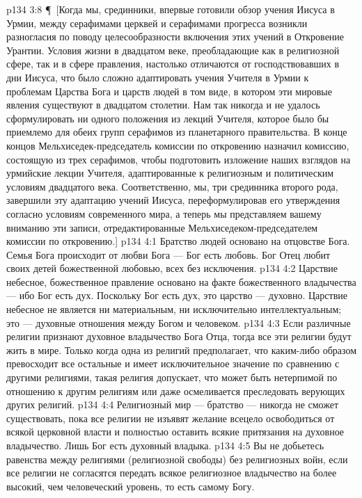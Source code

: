 \vs p134 3:8 \P\ [Когда мы, срединники, впервые готовили обзор учения Иисуса в Урмии, между серафимами церквей и серафимами прогресса возникли разногласия по поводу целесообразности включения этих учений в Откровение Урантии. Условия жизни в двадцатом веке, преобладающие как в религиозной сфере, так и в сфере правления, настолько отличаются от господствовавших в дни Иисуса, что было сложно адаптировать учения Учителя в Урмии к проблемам Царства Бога и царств людей в том виде, в котором эти мировые явления существуют в двадцатом столетии. Нам так никогда и не удалось сформулировать ни одного положения из лекций Учителя, которое было бы приемлемо для обеих групп серафимов из планетарного правительства. В конце концов Мельхиседек\hyp{}председатель комиссии по откровению назначил комиссию, состоящую из трех серафимов, чтобы подготовить изложение наших взглядов на урмийские лекции Учителя, адаптированные к религиозным и политическим условиям двадцатого века. Соответственно, мы, три срединника второго рода, завершили эту адаптацию учений Иисуса, переформулировав его утверждения согласно условиям современного мира, а теперь мы представляем вашему вниманию эти записи, отредактированные Мельхиседеком\hyp{}председателем комиссии по откровению.]
\vs p134 4:1 Братство людей основано на отцовстве Бога. Семья Бога происходит от любви Бога --- Бог есть любовь. Бог Отец любит своих детей божественной любовью, всех без исключения.
\vs p134 4:2 Царствие небесное, божественное правление основано на факте божественного владычества --- ибо Бог есть дух. Поскольку Бог есть дух, это царство --- духовно. Царствие небесное не является ни материальным, ни исключительно интеллектуальным; это --- духовные отношения между Богом и человеком.
\vs p134 4:3 Если различные религии признают духовное владычество Бога Отца, тогда все эти религии будут жить в мире. Только когда одна из религий предполагает, что каким\hyp{}либо образом превосходит все остальные и имеет исключительное значение по сравнению с другими религиями, такая религия допускает, что может быть нетерпимой по отношению к другим религиям или даже осмеливается преследовать верующих других религий.
\vs p134 4:4 Религиозный мир --- братство --- никогда не сможет существовать, пока все религии не изъявят желание всецело освободиться от всякой церковной власти и полностью оставить всякие притязания на духовное владычество. Лишь Бог есть духовный владыка.
\vs p134 4:5 Вы не добьетесь равенства между религиями (религиозной свободы) без религиозных войн, если все религии не согласятся передать всякое религиозное владычество на более высокий, чем человеческий уровень, то есть самому Богу.
